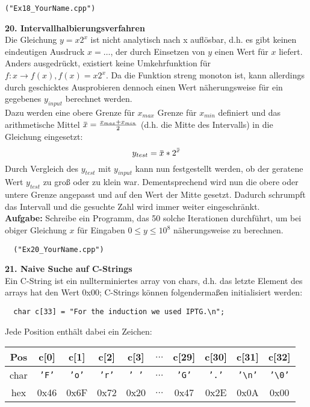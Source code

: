 \documentclass[paper=A4, pagesize, DIV=calc, smallheadings,
fontsize=11pt, expansion=false]{scrreprt}
\newcommand{\overbar}[1]{\mkern 1.5mu\overline{\mkern-1.5mu#1\mkern-1.5mu}\mkern 1.5mu}
\begin{document}
\begin{verbatim}
("Ex18_YourName.cpp")
\end{verbatim}


\textbf{20. Intervallhalbierungsverfahren}\\
  Die Gleichung $ y = x2^x$ ist nicht analytisch nach x auflösbar, d.h. es gibt keinen eindeutigen Ausdruck 
$x = \dots$, der durch Einsetzen von $y$ einen Wert für $x$ liefert. 
Anders ausgedrückt, existiert keine Umkehrfunktion für $f:x \longrightarrow f(x), f(x) = x2^x$.
 Da die Funktion streng monoton ist, kann allerdings durch geschicktes Ausprobieren dennoch einen Wert näherungsweise 
für ein gegebenes $y_{input}$ berechnet werden.\\
Dazu werden eine obere Grenze für $x_{max}$ Grenze für $x_{min}$ definiert 
und das arithmetische Mittel $\overbar{x} = \frac{x_{max} + x_{min}}{2}$ (d.h. die Mitte des Intervalls) in die Gleichung eingesetzt:
\[y_{test} = \overbar{x} * 2^{\overbar{x}}\]
Durch Vergleich des $y_{test}$ mit $y_{input}$ kann nun festgestellt werden, ob der geratene Wert 
$y_{test}$ zu groß oder zu klein war. Dementsprechend wird nun die obere oder untere Grenze angepasst und auf den Wert der Mitte gesetzt. 
Dadurch schrumpft das Intervall und die gesuchte Zahl wird immer weiter eingeschränkt.\\
\textbf{Aufgabe:} Schreibe ein Programm, das 50 solche Iterationen durchführt, um bei obiger Gleichung $x$ für Eingaben $0 \le y \le 10^8$ näherungsweise zu berechnen.
\normalsize
\begin{verbatim}
  ("Ex20_YourName.cpp")
\end{verbatim}    
\textbf{21. Naive Suche auf C-Strings} \\
  Ein C-String ist ein nullterminiertes array von chars, d.h. das letzte Element des arrays hat den Wert 0x00;
  C-Strings können folgendermaßen initialisiert werden:
  \begin{verbatim}
  char c[33] = "For the induction we used IPTG.\n";
\end{verbatim}
  Jede Position enthält dabei ein Zeichen:\\
\begin{center}
\begin{tabular}[H]{|c|c|c|c|c|c|c|c|c|c|}
\hline
Pos  & c[0]          & c[1]          & c[2]          & c[3]           & $\hdots$ & c[29]        & c[30]        & c[31]                       & c[32]                       \\ \hline
char & \texttt{'F'}  & \texttt{'o'}  & \texttt{'r'}  & \texttt{' '}   & $\hdots$ & \texttt{'G'} & \texttt{'.'} & \texttt{'\textbackslash n'} & \texttt{'\textbackslash 0'} \\ \hline
hex  &  0x46         & 0x6F          & 0x72          & 0x20           & $\hdots$ & 0x47         & 0x2E         & 0x0A                        & 0x00                        \\ \hline
\end{tabular}\vspace{0.5ex}
\end{center}
\end{document}
